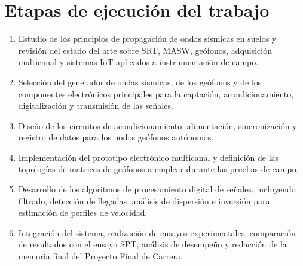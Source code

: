 \documentclass[11pt,a4paper]{article}
\begin{document}
\section{Etapas de ejecuci\'on del trabajo}
\begin{enumerate}
    \item Estudio de los principios de propagaci\'on de ondas s\'ismicas en suelos y revisi\'on del estado del arte sobre SRT, MASW, ge\'ofonos, adquisici\'on multicanal y sistemas IoT aplicados a instrumentaci\'on de campo.
    \item Selecci\'on del generador de ondas s\'ismicas, de los ge\'ofonos y de los componentes electr\'onicos principales para la captaci\'on, acondicionamiento, digitalizaci\'on y transmisi\'on de las se\~nales.
    \item Dise\~no de los circuitos de acondicionamiento, alimentaci\'on, sincronizaci\'on y registro de datos para los nodos ge\'ofonos aut\'onomos.
    \item Implementaci\'on del prototipo electr\'onico multicanal y definici\'on de las topolog\'ias de matrices de ge\'ofonos a emplear durante las pruebas de campo.
    \item Desarrollo de los algoritmos de procesamiento digital de se\~nales, incluyendo filtrado, detecci\'on de llegadas, an\'alisis de dispersi\'on e inversi\'on para estimaci\'on de perfiles de velocidad.
    \item Integraci\'on del sistema, realizaci\'on de ensayos experimentales, comparaci\'on de resultados con el ensayo SPT, an\'alisis de desempe\~no y redacci\'on de la memoria final del Proyecto Final de Carrera.
\end{enumerate}
\end{document}
